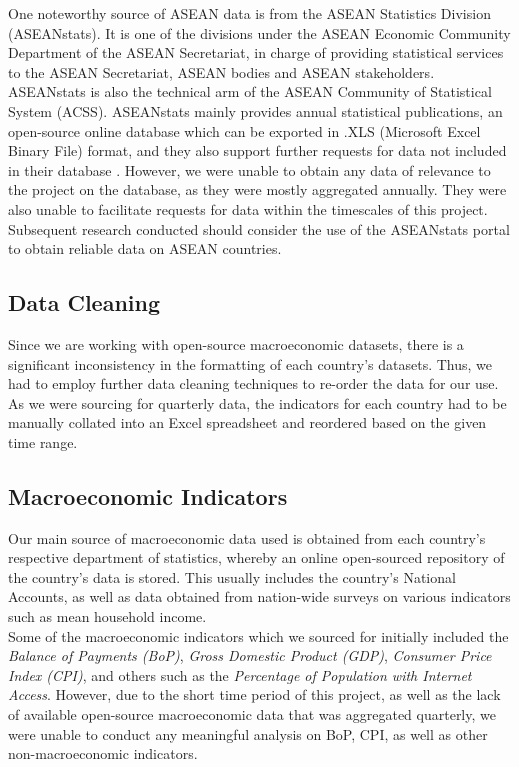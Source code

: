 \documentclass{article}
\begin{document}
\noindent One noteworthy source of ASEAN data is from the ASEAN Statistics Division (ASEANstats). It is one of the divisions under the ASEAN Economic Community Department of the ASEAN Secretariat, in charge of providing statistical services to the ASEAN Secretariat, ASEAN bodies and ASEAN stakeholders. ASEANstats is also the technical arm of the ASEAN Community of Statistical System (ACSS). ASEANstats mainly provides annual statistical publications, an open-source online database which can be exported in .XLS (Microsoft Excel Binary File) format, and they also support further requests for data not included in their database \cite{aseanstats}. However, we were unable to obtain any data of relevance to the project on the database, as they were mostly aggregated annually. They were also unable to facilitate requests for data within the timescales of this project. Subsequent research conducted should consider the use of the ASEANstats portal to obtain reliable data on ASEAN countries. 

\subsection{Data Cleaning}
Since we are working with open-source macroeconomic datasets, there is a significant inconsistency in the formatting of each country's datasets. Thus, we had to employ further data cleaning techniques to re-order the data for our use. As we were sourcing for quarterly data, the indicators for each country had to be manually collated into an Excel spreadsheet and reordered based on the given time range.

\subsection{Macroeconomic Indicators}
Our main source of macroeconomic data used is obtained from each country's respective department of statistics, whereby an online open-sourced repository of the country's data is stored. This usually includes the country's National Accounts, as well as data obtained from nation-wide surveys on various indicators such as mean household income. \\

\noindent Some of the macroeconomic indicators which we sourced for initially included the \textit{Balance of Payments (BoP)}, \textit{Gross Domestic Product (GDP)}, \textit{Consumer Price Index (CPI)}, and others such as the \textit{Percentage of Population with Internet Access}. However, due to the short time period of this project, as well as the lack of available open-source macroeconomic data that was aggregated quarterly, we were unable to conduct any meaningful analysis on BoP, CPI, as well as other non-macroeconomic indicators. \\
\end{document}
